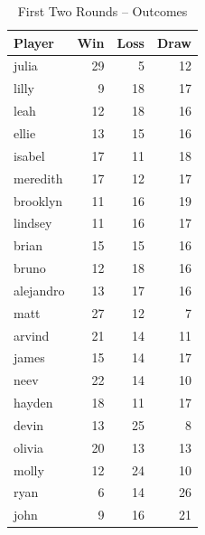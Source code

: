 \documentclass[12pt]{article}
\begin{document}
\begin{multicols}{2}
\begin{table}[H]
\centering
\caption{First Two Rounds – Outcomes}
\label{tab:first2_outcomes}
\begin{tabular}{lrrr}
\toprule
\textbf{Player} & \textbf{Win} & \textbf{Loss} & \textbf{Draw} \\
\midrule
julia & 29 & 5 & 12 \\
lilly & 9 & 18 & 17 \\
leah & 12 & 18 & 16 \\
ellie & 13 & 15 & 16 \\
isabel & 17 & 11 & 18 \\
meredith & 17 & 12 & 17 \\
brooklyn & 11 & 16 & 19 \\
lindsey & 11 & 16 & 17 \\
brian & 15 & 15 & 16 \\
bruno & 12 & 18 & 16 \\
alejandro & 13 & 17 & 16 \\
matt & 27 & 12 & 7 \\
arvind & 21 & 14 & 11 \\
james & 15 & 14 & 17 \\
neev & 22 & 14 & 10 \\
hayden & 18 & 11 & 17 \\
devin & 13 & 25 & 8 \\
olivia & 20 & 13 & 13 \\
molly & 12 & 24 & 10 \\
ryan & 6 & 14 & 26 \\
john & 9 & 16 & 21 \\
\bottomrule
\end{tabular}
\end{table}


\end{multicols}
\end{document}
